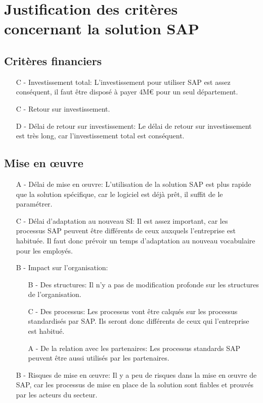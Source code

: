 \section{Justification des critères concernant la solution SAP}

\subsection{Critères financiers}

\begin{itemize}
\item [C -] Investissement total:\el
	L'investissement pour utiliser SAP est assez conséquent,
    il faut être disposé à payer 4M€ pour un seul département.
	
\item [C -] Retour sur investissement.
		
\item [D -] Délai de retour sur investissement:\el
	Le délai de retour sur investissement est très long,
    car l'investissement total est conséquent.
\end{itemize}

\subsection{Mise en \oe{}uvre}

\begin{itemize}
\item [A -] Délai de mise en \oe{}uvre:\el
	L'utilisation de la solution SAP est plus rapide que la solution
    spécifique, car le logiciel est déjà prêt, il suffit de le paramétrer.

\item [C -] Délai d'adaptation au nouveau SI:\el
	Il est assez important, car les processus SAP peuvent être
    différents de ceux auxquels l'entreprise est habituée. Il faut
    donc prévoir un temps d'adaptation au nouveau vocabulaire pour
    les employés.

\item [B -] Impact sur l'organisation:
    \begin{itemize}
	\item[B -] Des structures:\el
		Il n'y a pas de modification profonde sur les structures
        de l'organisation.
		
	\item[C -] Des processus:\el
		Les processus vont être calqués sur les processus standardisés
        par SAP. Ils seront donc différents de ceux qui l'entreprise
        est habitué.

	\item[A -] De la relation avec les partenaires:\el
		Les processus standards SAP peuvent être aussi utilisés par
        les partenaires.
    \end{itemize}

\item[B -] Risques de mise en \oe{}uvre:\el
	Il y a peu de risques dans la mise en \oe{}uvre de SAP, car les processus
    de mise en place de la solution sont fiables et prouvés par les acteurs
    du secteur. 
\end{itemize}
	

